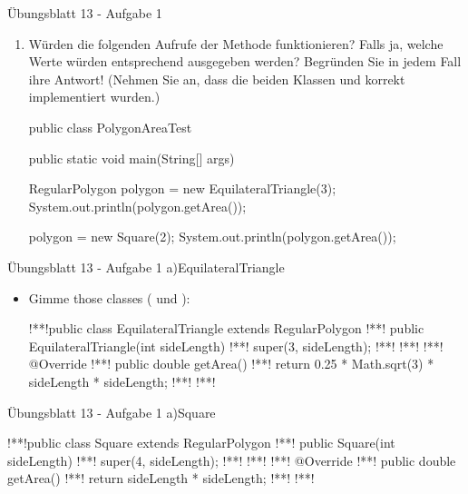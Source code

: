 \begin{frame}[c,fragile]{Übungsblatt 13 - Aufgabe 1}
\small\begin{enumerate}
    \item<2->[6.] Würden die folgenden Aufrufe der Methode  funktionieren? Falls ja, welche Werte würden entsprechend ausgegeben werden? Begründen Sie in jedem Fall ihre Antwort!
    (Nehmen Sie an, dass die beiden Klassen  und  korrekt implementiert wurden.)
\begin{plainjava}[morekeywords={[3]{PolygonTest,RegularPolygon,PolygonAreaTest,EquilateralTriangle,Square}}]
public class PolygonAreaTest {
    public static void main(String[] args) {
        RegularPolygon polygon = new EquilateralTriangle(3);
        System.out.println(polygon.getArea());

        polygon = new Square(2);
        System.out.println(polygon.getArea());
    }
}
\end{plainjava}
    \end{enumerate}
\end{frame}
\fi

\begin{frame}[t,fragile]{Übungsblatt 13 - Aufgabe 1 a)\hfill EquilateralTriangle}
\SetupLstHl\begin{itemize}[<+(1)->]
    \item Gimme those classes ( und ):
\begin{plainjava}[morekeywords={[3]{PolygonTest,RegularPolygon,EquilateralTriangle,Square}},add to literate={@Override}{{\color{gray}@Override}}9]
!**!public class EquilateralTriangle extends RegularPolygon {
!**!    public EquilateralTriangle(int sideLength) {
!**!        super(3, sideLength);
!**!    }
!**!
!**!    @Override
!**!    public double getArea() {
!**!        return 0.25 * Math.sqrt(3) * sideLength * sideLength;
!**!    }
!**!}
\end{plainjava}
\end{itemize}
\end{frame}

\begin{frame}[c,fragile]{Übungsblatt 13 - Aufgabe 1 a)\hfill Square}
\SetupLstHl
\begin{plainjava}[morekeywords={[3]{PolygonTest,RegularPolygon,EquilateralTriangle,Square}},add to literate={@Override}{{\color{gray}@Override}}9]
!**!public class Square extends RegularPolygon {
!**!    public Square(int sideLength) {
!**!        super(4, sideLength);
!**!    }
!**!
!**!    @Override
!**!    public double getArea() {
!**!        return sideLength * sideLength;
!**!    }
!**!}
\end{plainjava}
\end{frame}


